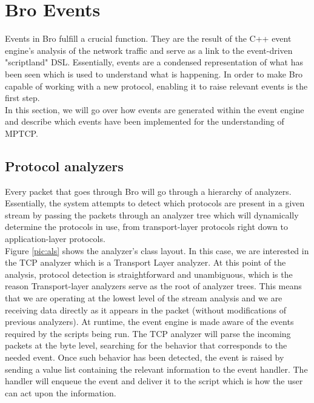 
\chapter{Bro Events} \label{chap:events}
Events in Bro fulfill a crucial function. They are the result of the C++ event engine's analysis of the network traffic and serve as a link to the event-driven "scriptland" DSL. Essentially, events are a condensed representation of what has been seen which is used to understand what is happening. In order to make Bro capable of working with a new protocol, enabling it to raise relevant events is the first step. \\

In this section, we will go over how events are generated within the event engine and describe which events have been implemented for the understanding of MPTCP.


\section{Protocol analyzers}
Every packet that goes through Bro will go through a hierarchy of analyzers. Essentially, the system attempts to detect which protocols are present in a given stream by passing the packets through an analyzer tree which will dynamically determine the protocols in use, from transport-layer protocols right down to application-layer protocols. \\ 

Figure \ref{pic:als} shows the analyzer's class layout. In this case, we are interested in the TCP analyzer which is a Transport Layer analyzer. At this point of the analysis, protocol detection is straightforward and unambiguous, which is the reason Transport-layer analyzers serve as the root of analyzer trees. This means that we are operating at the lowest level of the stream analysis and we are receiving data directly as it appears in the packet (without modifications of previous analyzers). At runtime, the event engine is made aware of the events required by the scripts being run. The TCP analyzer will parse the incoming packets at the byte level, searching for the behavior that corresponds to the needed event. Once such behavior has been detected, the event is raised by sending a value list containing the relevant information to the event handler. The handler will enqueue the event and deliver it to the script which is how the user can act upon the information. \\

